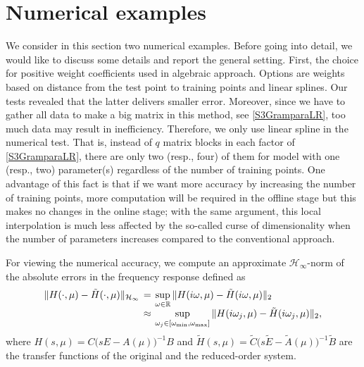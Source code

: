 

\section{Numerical examples}\label{Sec:NumerExam}
We consider in this section two numerical examples. Before going into detail, we would like to discuss some details and report the general setting. First, the choice for positive weight coefficients used in algebraic approach. Options are weights based on distance from the test point to training points and linear splines. Our tests revealed that the latter delivers smaller error. Moreover, since we have to gather all data to make a big matrix in this method, see \eqref{S3GramparaLR}, too much data may result in inefficiency. Therefore, we only use linear spline in the numerical test. That is, instead of $q$ matrix blocks in each factor of \eqref{S3GramparaLR}, there are only two (resp., four) of them for model with one (resp., two) parameter(s) regardless of the number of training points. One advantage of this fact is that if we want more accuracy by increasing the number of training points, more computation will be required in the offline stage but this makes no changes in the online stage; with the same argument, this local interpolation is much less affected by the so-called curse of dimensionality when the number of parameters increases compared to the conventional approach. 

For viewing the numerical accuracy, we compute an approximate $\mathcal{H}_\infty$-norm of the absolute errors in the frequency response defined as
\begin{equation}
\arraycolsep=2pt
\begin{array}{rcl}
\|H(\cdot,\mu)-\tilde{H}(\cdot,\mu)\|_{\mathcal{H}_\infty} & = &
\displaystyle{\sup_{\omega\in\mathbb{R}}\|H(i\omega,\mu)-\tilde{H}(i\omega,\mu)\|_2} \\
& \approx &  
\displaystyle{\sup_{\omega_j\in[\omega_{\min},\omega_{\max}]}\|H(i\omega_j,\mu)-\tilde{H}(i\omega_j,\mu)\|_2,}
\end{array}
\label{eq:errH}
\end{equation}
where $H(s,\mu)=C\bigl(sE-A(\mu)\bigr)^{-1}B$ and $\tilde{H}(s,\mu)=\tilde{C}\bigl(s\tilde{E}-\tilde{A}(\mu)\bigr)^{-1}\tilde{B}$ are the transfer functions of the original and the reduced-order system.

